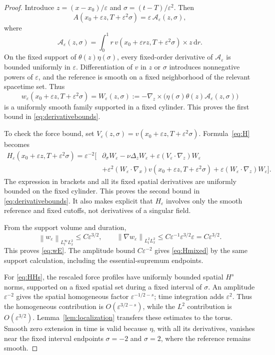\documentclass[11pt,a4paper]{article}
\theoremstyle{definition}\newtheorem{definition}[theorem]{Definition}
\theoremstyle{remark}\newtheorem{remark}[theorem]{Remark}
\newcommand{\dd}{\,\mathrm d}\newcommand{\eps}{\varepsilon}
\newcommand{\norm}[1]{\left\lVert#1\right\rVert}
\begin{document}
\begin{proof}
Introduce $z=(x-x_0)/\eps$ and $\sigma=(t-T)/\eps^2$. Then
\[
 A(x_0+\eps z,T+\eps^2\sigma)=\eps\,\mathcal A_\eps(z,\sigma),
\]
where
\[
 \mathcal A_\eps(z,\sigma)
 =\int_0^1r\,v(x_0+\eps rz,T+\eps^2\sigma)\times z\dd r.
\]
On the fixed support of $\theta(z)\eta(\sigma)$, every fixed-order derivative of $\mathcal A_\eps$ is bounded uniformly in $\eps$. Differentiation of $v$ in $z$ or $\sigma$ introduces nonnegative powers of $\eps$, and the reference is smooth on a fixed neighborhood of the relevant spacetime set. Thus
\[
 w_\eps(x_0+\eps z,T+\eps^2\sigma)
 =W_\eps(z,\sigma)
 :=-\nabla_z\times\bigl(\eta(\sigma)\theta(z)\mathcal A_\eps(z,\sigma)\bigr)
\]
is a uniformly smooth family supported in a fixed cylinder. This proves the first bound in \eqref{eq:derivativebounds}.

To check the force bound, set
$V_\eps(z,\sigma)=v(x_0+\eps z,T+\eps^2\sigma)$.
Formula~\eqref{eq:H} becomes
\begin{align*}
 H_\eps(x_0+\eps z,T+\eps^2\sigma)
 =\eps^{-2}\bigl[&
 \partial_\sigma W_\eps-\nu\Delta_zW_\eps
 +\eps(V_\eps\cdot\nabla_z)W_\eps\\
 &+\eps^2(W_\eps\cdot\nabla_x)v(x_0+\eps z,T+\eps^2\sigma)
 +\eps(W_\eps\cdot\nabla_z)W_\eps\bigr].
\end{align*}
The expression in brackets and all its fixed spatial derivatives are uniformly bounded on the fixed cylinder. This proves the second bound in \eqref{eq:derivativebounds}. It also makes explicit that $H_\eps$ involves only the smooth reference and fixed cutoffs, not derivatives of a singular field.

From the support volume and duration,
\[
 \norm{w_\eps}_{L^\infty_tL^2_x}\le C\eps^{3/2},\qquad
 \norm{\nabla w_\eps}_{L^2_tL^2_x}
 \le C\eps^{-1}\eps^{3/2}\eps=C\eps^{3/2}.
\]
This proves \eqref{eq:wE}. The amplitude bound $C\eps^{-2}$ gives
\eqref{eq:Hmixed} by the same support calculation, including the essential-supremum endpoints.

For \eqref{eq:HHs}, the rescaled force profiles have uniformly bounded spatial $H^s$ norms, supported on a fixed spatial set during a fixed interval of $\sigma$. An amplitude $\eps^{-2}$ gives the spatial homogeneous factor $\eps^{-1/2-s}$; time integration adds $\eps^2$. Thus the homogeneous contribution is $O(\eps^{3/2-s})$, while the $L^2$ contribution is $O(\eps^{3/2})$. Lemma~\ref{lem:localization} transfers these estimates to the torus. Smooth zero extension in time is valid because $\eta$, with all its derivatives, vanishes near the fixed interval endpoints $\sigma=-2$ and $\sigma=2$, where the reference remains smooth.
\end{proof}
\end{document}

